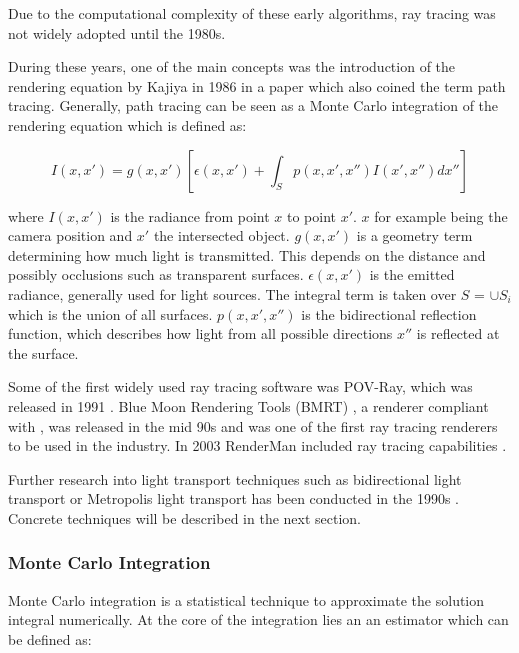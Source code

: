 Due to the computational complexity of these early algorithms, ray tracing was not widely adopted until the 1980s.

During these years, one of the main concepts was the introduction of the rendering equation by Kajiya in 1986 in a paper which also coined the term path tracing. Generally, path tracing can be seen as a Monte Carlo integration of the rendering equation which is defined as:

\begin{equation}
  \label{eqn:rendering-equation}
  I(x, x') = g(x, x') [\epsilon(x, x') + \int_{S} p(x, x', x'')I(x', x'')dx'']
\end{equation}

where $I(x, x')$ is the radiance from point $x$ to point $x'$. $x$ for example being the camera position and $x'$ the intersected object. $g(x, x')$ is a geometry term determining how much light is transmitted. This depends on the distance and possibly occlusions such as transparent surfaces. $\epsilon(x, x')$ is the emitted radiance, generally used for light sources. The integral term is taken over $S$ = $\cup S_i$ which is the union of all surfaces. $p(x, x', x'')$ is the bidirectional reflection function, which describes how light from all possible directions $x''$ is reflected at the surface. \cite{kajiya1986rendering}

Some of the first widely used ray tracing software was POV-Ray, which was released in 1991 \cite{POV_Ray_Documentation}. Blue Moon Rendering Tools (\gls{BMRT}) \cite{bmrt}, a renderer compliant with , was released in the mid 90s and was one of the first ray tracing renderers to be used in the industry. In 2003 \gls{RenderMan} included ray tracing capabilities \cite{RenderMan_11_Release_Notes}.

Further research into light transport techniques such as bidirectional light transport or Metropolis light transport has been conducted in the 1990s \cite{veachMonteCarloLightTransport}. Concrete techniques will be described in the next section.

\subsubsection{Monte Carlo Integration}

Monte Carlo integration is a statistical technique to approximate the solution integral numerically. At the core of the integration lies an an estimator which can be defined as:

